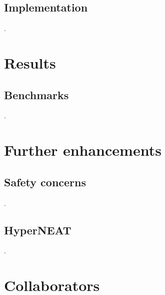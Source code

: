 \documentclass[11pt]{article}
\begin{document}
		\subsection{Implementation}
			.
	\newpage

	\section{Results}
		\subsection{Benchmarks}
			.
	\newpage

	\section{Further enhancements}
		\subsection{Safety concerns}
			.
		\subsection{HyperNEAT}
			.
	\newpage

	\section{Collaborators}
		
	\newpage

	\nocite{*}
	
	
\end{document}
